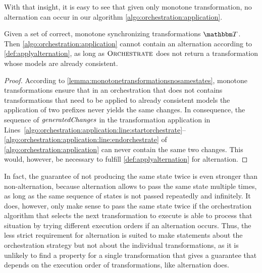 With that insight, it is easy to see that given only monotone transformation, no alternation can occur in our algorithm \autoref{algo:orchestration:application}.
\begin{theorem}
    Given a set of correct, monotone synchronizing transformations $\transformationset{T}$.
    Then \autoref{algo:orchestration:application} cannot contain an alternation according to \autoref{def:applyalternation}, as long as $\textsc{Orchestrate}$ does not return a transformation whose models are already consistent.
\end{theorem}
\begin{proof}
    According to \autoref{lemma:monotonetransformationsnosamestates}, monotone transformations ensure that in an orchestration that does not contains transformations that need to be applied to already consistent models the application of two prefixes never yields the same changes.
    In consequence, the sequence of $\mathit{generatedChanges}$ in the transformation application in 
    Lines~\autoref{algo:orchestration:application:line:startorchestrate}--\autoref{algo:orchestration:application:line:endorchestrate} of \autoref{algo:orchestration:application} can never contain the same two changes.
    This would, however, be necessary to fulfill \autoref{def:applyalternation} for alternation.
\end{proof}

In fact, the guarantee of not producing the same state twice is even stronger than non-alternation, because alternation allows to pass the same state multiple times, as long as the same sequence of states is not passed repeatedly and infinitely.
It does, however, only make sense to pass the same state twice if the orchestration algorithm that selects the next transformation to execute is able to process that situation by trying different execution orders if an alternation occurs.
Thus, the less strict requirement for alternation is suited to make statements about the orchestration strategy but not about the individual transformations, as it is unlikely to find a property for a single transformation that gives a guarantee that depends on the execution order of transformations, like alternation does.

